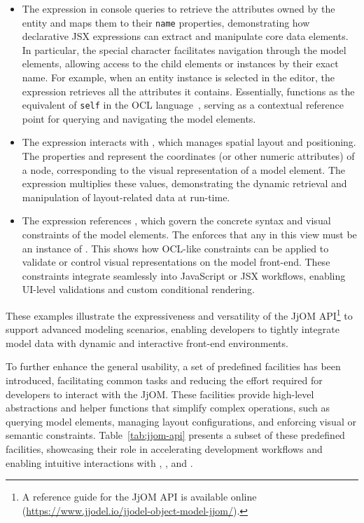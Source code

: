 \begin{itemize}
    \item The expression in console  queries  to retrieve the attributes owned by the  entity and maps them to their \texttt{name} properties, demonstrating how declarative JSX expressions can extract and manipulate core data elements. In particular, the special character \code{\$} facilitates navigation through the model elements, allowing access to the child elements or instances by their exact name. For example, when an entity instance is selected in the editor, the expression  retrieves all the attributes it contains. Essentially,  functions as the equivalent of \texttt{self} in the OCL language~\cite{Cabot2012}, serving as a contextual reference point for querying and navigating the model elements.
    \item The expression  interacts with , which manages spatial layout and positioning. The properties  and  represent the coordinates (or other numeric attributes) of a node, corresponding to the visual representation of a model element. The expression multiplies these values, demonstrating the dynamic retrieval and manipulation of layout-related data at run-time.
    \item  The expression  references , which govern the concrete syntax and visual constraints of the model elements. The  enforces that any  in this view must be an instance of . This shows how OCL-like constraints can be applied to validate or control visual representations on the model front-end. These constraints integrate seamlessly into JavaScript or JSX workflows, enabling UI-level validations and custom conditional rendering.
\end{itemize}
These examples illustrate the expressiveness and versatility of the JjOM API\footnote{A reference guide for the JjOM API is available online (\url{https://www.jjodel.io/jjodel-object-model-jjom/}).} to support advanced modeling scenarios, enabling developers to tightly integrate model data with dynamic and interactive front-end environments.

To further enhance the general usability, a set of predefined facilities has been introduced, facilitating common tasks and reducing the effort required for developers to interact with the JjOM. These facilities provide high-level abstractions and helper functions that simplify complex operations, such as querying model elements, managing layout configurations, and enforcing visual or semantic constraints. Table~\ref{tab:jjom-api} presents a subset of these predefined facilities, showcasing their role in accelerating development workflows and enabling intuitive interactions with , , and . 

